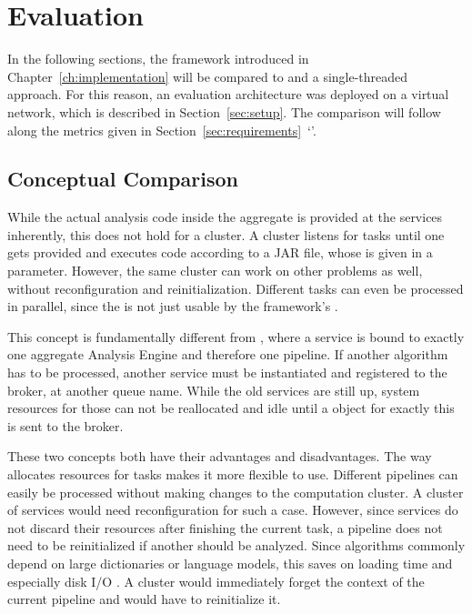 \chapter{Evaluation}
\label{ch:evaluation}
In the following sections, the framework introduced in Chapter~\ref{ch:implementation} will be compared to \uimaas{} and a single-threaded approach. For this reason, an evaluation architecture was deployed on a virtual network, which is described in Section~\ref{sec:setup}. The comparison will follow along the metrics given in Section~\ref{sec:requirements}~`'.

\section{Conceptual Comparison}
\label{sec:concept}
While the actual analysis code inside the aggregate \anen{} is provided at the \uimaas{} services inherently, this does not hold for a \spark{} cluster. A \spark{} cluster listens for tasks until one gets provided and  executes code according to a JAR file, whose \URL{} is given in a parameter. However, the same cluster can work on other problems as well, without reconfiguration and reinitialization. Different tasks can even be processed in parallel, since the \spark{} is not just usable by the framework's \api{}.

This concept is fundamentally different from \uimaas{}, where a service is bound to exactly one aggregate Analysis Engine and therefore one pipeline. If another \nlp{} algorithm has to be processed, another \uimaas{} service must be instantiated and registered to the broker, at another queue name. While the old services are still up, system resources for those can not be reallocated and idle until a \cas{} object for exactly this \anen{} is sent to the broker. 

These two concepts both have their advantages and disadvantages. The way \spark{} allocates resources for tasks makes it more flexible to use. Different pipelines can easily be processed without making changes to the computation cluster. A cluster of \uimaas{} services would need reconfiguration for such a case. However, since \uimaas{} services do not discard their resources after finishing the current task, a pipeline does not need to be reinitialized if another \cas{} should be analyzed. Since \nlp{} algorithms commonly depend on large dictionaries or language models, this saves on loading time and especially disk I/O \cite{sanderson2010manning}. A \spark{} cluster would immediately forget the context of the current pipeline and would have to reinitialize it.

